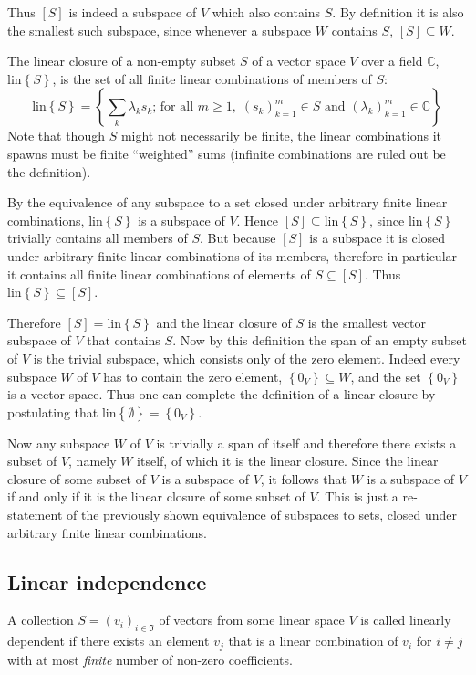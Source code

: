 \documentclass[a4paper]{article}
\newcommand{\obj}[1]{\ensuremath{\left\{ #1 \right\}}}
\newcommand{\brac}[1]{\ensuremath{\left( #1 \right)}}
\newcommand{\lin}[1]{\ensuremath{\text{lin}\obj{ #1 }}}
\newcommand{\spn}[1]{\ensuremath{\left[ #1 \right]}}
\begin{document}
Thus $\spn{S}$ is indeed a subspace of $V$ which also contains $S$. By definition it is also the smallest such subspace, since whenever a subspace $W$ contains $S$, $\spn{S} \subseteq W$.

The linear closure of a non-empty subset $S$ of a vector space $V$ over a field $\mathbb{C}$, $\lin S$, is the set of all finite linear combinations of members of $S$: \[\lin S = \obj{\sum_k \lambda_k s_k \text{; for all } m \geq 1,\; \brac{s_k}_{k=1}^m \in S \text{ and } \brac{\lambda_k}_{k=1}^m \in \mathbb{C}}\] Note that though $S$ might not necessarily be finite, the linear combinations it spawns must be finite ``weighted'' sums (infinite combinations are ruled out be the definition).

By the equivalence of any subspace to a set closed under arbitrary finite linear combinations, $\lin{S}$ is a subspace of $V$. Hence $\spn{S} \subseteq \lin{S}$, since $\lin{S}$ trivially contains all members of $S$. But because $\spn{S}$ is a subspace it is closed under arbitrary finite linear combinations of its members, therefore in particular it contains all finite linear combinations of elements of $S \subseteq \spn{S}$. Thus $\lin{S} \subseteq \spn{S}$.

Therefore $\spn{S} = \lin{S}$ and the linear closure of $S$ is the smallest vector subspace of $V$ that contains $S$. Now by this definition the span of an empty subset of $V$ is the trivial subspace, which consists only of the zero element. Indeed every subspace $W$ of $V$ has to contain the zero element, $\obj{0_V} \subseteq W$, and the set $\obj{0_V}$ is a vector space. Thus one can complete the definition of a linear closure by postulating that $\lin{\emptyset} = \obj{0_V}$.

Now any subspace $W$ of $V$ is trivially a span of itself and therefore there exists a subset of $V$, namely $W$ itself, of which it is the linear closure. Since the linear closure of some subset of $V$ is a subspace of $V$, it follows that $W$ is a subspace of $V$ if and only if it is the linear closure of some subset of $V$. This is just a re-statement of the previously shown equivalence of subspaces to sets, closed under arbitrary finite linear combinations.

\subsection{Linear independence} %
\label{sub:linear_independence}
A collection $S=\brac{v_i}_{i\in \mathfrak{I}}$ of vectors from some linear space $V$ is called linearly dependent if there exists an element $v_j$ that is a linear combination of $v_i$ for $i\neq j$ with at most \emph{finite} number of non-zero coefficients.
\end{document}
